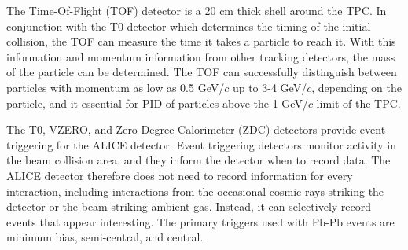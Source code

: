 The Time-Of-Flight (TOF) detector is a 20 cm thick shell around the TPC.
In conjunction with the T0 detector which determines the timing of the initial collision, the TOF can measure the time it takes a particle to reach it.
With this information and momentum information from other tracking detectors, the mass of the particle can be determined.
The TOF can successfully distinguish between particles with momentum as low as 0.5 GeV/$c$ up to 3-4 GeV/$c$, depending on the particle, and it essential for PID of particles above the 1 GeV/$c$ limit of the TPC. 

The T0, VZERO, and Zero Degree Calorimeter (ZDC) detectors provide event triggering for the ALICE detector.
Event triggering detectors monitor activity in the beam collision area, and they inform the detector when to record data.
The ALICE detector therefore does not need to record information for every interaction, including interactions from the occasional cosmic rays striking the detector or the beam striking ambient gas.
Instead, it can selectively record events that appear interesting.
The primary triggers used with Pb-Pb events are minimum bias, semi-central, and central.

